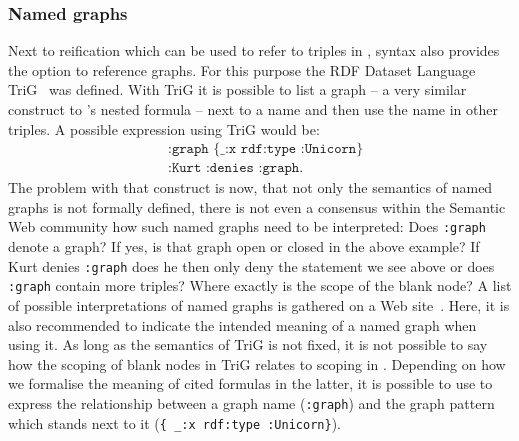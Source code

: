 
% 

\subsubsection{Named graphs}
Next to reification which can be used to refer to triples in \rdf, \rdf syntax also provides the option to reference graphs. 
%
For this purpose the RDF Dataset Language TriG~\cite{TriG} was defined. With TriG it is possible to 
list a graph -- a very similar construct to \nthree's nested formula -- next to a name and then use the name in other triples. A possible expression using TriG would be:
\begin{equation}
 \begin{split}
& \texttt{:graph } \texttt{\{ \_:x rdf:type :Unicorn\}}\\
& \texttt{:Kurt } \texttt{:denies :graph.}
 \end{split}
\end{equation}
The problem with that construct is now, that not only the semantics of named graphs is not formally defined, there is not even a consensus within the Semantic Web community how 
such named graphs need to be interpreted: Does \texttt{:graph} denote a graph? If yes, is that graph open or closed in the above example? If Kurt denies \texttt{:graph} does he then only deny the statement we see above or does 
\texttt{:graph} contain more triples? Where exactly is the scope of the blank node? A list of possible interpretations of named graphs is gathered on a Web site~\cite{TriGsemantics}. 
Here, it is also recommended to indicate the intended meaning of a named graph when using it. As long as the semantics of TriG is not fixed, it is not possible to say how the scoping 
of blank nodes in TriG relates to scoping in \nthree. Depending on how we formalise the meaning of cited formulas in the latter, it is  possible to use \nthree to 
express the relationship between a graph name (\texttt{:graph}) and the graph pattern which stands next to it (\texttt{\{ \_:x rdf:type :Unicorn\}})\cite{n3andnamedgraphs}.

